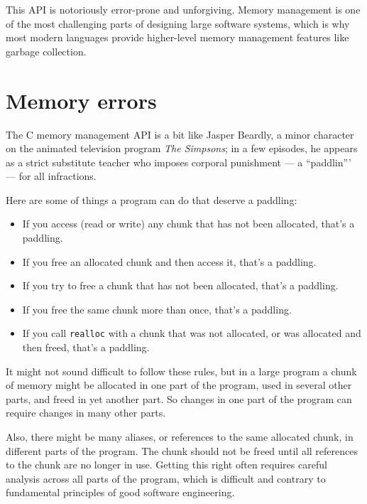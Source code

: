 \documentclass[12pt]{book}
\begin{document}
This API is notoriously error-prone and unforgiving.  Memory management
is one of the most challenging parts of designing large software systems,
which is why most modern languages provide higher-level memory
management features like garbage collection.


\section{Memory errors}

The C memory management API is a bit like Jasper Beardly, a minor
character on the animated television program {\it The Simpsons}; 
in a few episodes, he appears as a strict substitute teacher who imposes corporal punishment --- a ``paddlin''' --- for all infractions.

Here are some of things a program can do that deserve a paddling:

\begin{itemize}

\item If you access (read or write) any chunk that has not been
allocated, that's a paddling.

\item If you free an allocated chunk and then access it, that's
a paddling.

\item If you try to free a chunk that has not been allocated,
that's a paddling.

\item If you free the same chunk more than once, that's a paddling.

\item If you call {\tt realloc} with a chunk that was not allocated,
or was allocated and then freed, that's a paddling.

\end{itemize}

It might not sound difficult to follow these rules, but in a large
program a chunk of memory might be allocated in one part of the
program, used in several other parts, and freed in yet another
part.  So changes in one part of the program can require changes
in many other parts.

Also, there might be many aliases, or references to the same allocated
chunk, in different parts of the program.  The chunk should not be
freed until all references to the chunk are no longer in use.  
Getting this right often requires careful analysis across all parts
of the program, which is difficult and contrary to fundamental
principles of good software engineering.
\end{document}
